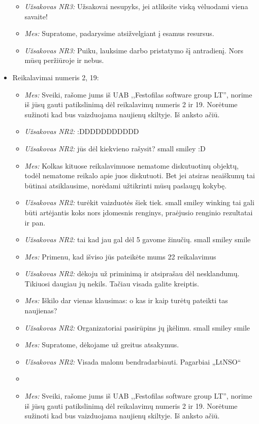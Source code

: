 \documentclass{VUMIFPSkursinis}
\begin{document}
\begin{itemize}
\begin{itemize}
					\item \textit{Užsakovas NR3:} Užsakovai nesupyks, jei atliksite viską vėluodami viena savaite!
					\item \textit{Mes:} Supratome, padarysime atsižvelgiant į esamus resursus.
					\item \textit{Užsakovas NR3:} Puiku, lauksime darbo pristatymo šį antradienį. Nors mūsų peržiūroje ir nebus.
				\end{itemize}
			\item Reikalavimai numeris 2, 19:
				\begin{itemize}
					\item \textit{Mes:} Sveiki, rašome jums iš UAB ,,Festofilas software group LT'', norime iš jūsų gauti patikslinimą dėl reikalavimų numeris 2 ir 19. Norėtume sužinoti kad bus vaizduojama naujienų skiltyje. Iš anksto ačiū.
					\item \textit{Užsakovas NR2:} :DDDDDDDDDDD
					\item \textit{Užsakovas NR2:} jūs dėl kiekvieno rašysit? small smiley :D
					\item \textit{Mes:} Kolkas kituose reikalavimuose nematome diskutuotinų objektų, todėl nematome reikalo apie juos diskutuoti. Bet jei atsiras neaiškumų tai būtinai atsiklausime, norėdami užtikrinti mūsų paslaugų kokybę.
					\item \textit{Užsakovas NR2:} turėkit vaizduotės šiek tiek. small smiley winking tai gali būti artėjantis koks nors įdomesnis renginys, praėjusio renginio rezultatai ir pan.
					\item \textit{Užsakovas NR2:} tai kad jau gal dėl 5 gavome žinučių. small smiley smile
					\item \textit{Mes:} Primenu, kad išviso jūs pateikėte mums 22 reikalavimus
					\item \textit{Užsakovas NR2:} dėkoju už priminimą ir atsiprašau dėl nesklandumų. Tikiuosi daugiau jų nekils. Tačiau visada galite kreiptis.
					\item \textit{Mes:} Iškilo dar vienas klausimas: o kas ir kaip turėtų pateikti tas naujienas?
					\item \textit{Užsakovas NR2:} Organizatoriai pasirūpins jų įkėlimu. small smiley smile
					\item \textit{Mes:} Supratome, dėkojame už greitus atsakymus.
					\item \textit{Užsakovas NR2:} Visada malonu bendradarbiauti. Pagarbiai „LtNSO“
					\item[ ]
					\item \textit{Mes:} Sveiki, rašome jums iš UAB ,,Festofilas software group LT'', norime iš jūsų gauti patikslinimą dėl reikalavimų numeris 2 ir 19. Norėtume sužinoti kad bus vaizduojama naujienų skiltyje. Iš anksto ačiū.

\end{itemize}
\end{itemize}
\end{document}
